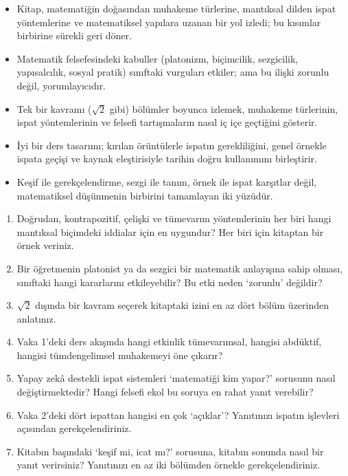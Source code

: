 
\begin{itemize}[leftmargin=1.4em]
\item Kitap, matematiğin doğasından muhakeme türlerine, mantıksal dilden ispat yöntemlerine ve matematiksel yapılara uzanan bir yol izledi; bu kısımlar birbirine sürekli geri döner.
\item Matematik felsefesindeki kabuller (platonizm, biçimcilik, sezgicilik, yapısalcılık, sosyal pratik) sınıftaki vurguları etkiler; ama bu ilişki zorunlu değil, yorumlayıcıdır.
\item Tek bir kavramı ($\sqrt2$ gibi) bölümler boyunca izlemek, muhakeme türlerinin, ispat yöntemlerinin ve felsefi tartışmaların nasıl iç içe geçtiğini gösterir.
\item İyi bir ders tasarımı; kırılan örüntülerle ispatın gerekliliğini, genel örnekle ispata geçişi ve kaynak eleştirisiyle tarihin doğru kullanımını birleştirir.
\item Keşif ile gerekçelendirme, sezgi ile tanım, örnek ile ispat karşıtlar değil, matematiksel düşünmenin birbirini tamamlayan iki yüzüdür.
\end{itemize}


\begin{enumerate}[leftmargin=1.8em,label=\textbf{\arabic*.}]
\item Doğrudan, kontrapozitif, çelişki ve tümevarım yöntemlerinin her biri hangi mantıksal biçimdeki iddialar için en uygundur? Her biri için kitaptan bir örnek veriniz.
\item Bir öğretmenin platonist ya da sezgici bir matematik anlayışına sahip olması, sınıftaki hangi kararlarını etkileyebilir? Bu etki neden ‘zorunlu’ değildir?
\item $\sqrt2$ dışında bir kavram seçerek kitaptaki izini en az dört bölüm üzerinden anlatınız.
\item Vaka 1’deki ders akışında hangi etkinlik tümevarımsal, hangisi abdüktif, hangisi tümdengelimsel muhakemeyi öne çıkarır?
\item Yapay zekâ destekli ispat sistemleri ‘matematiği kim yapar?’ sorusunu nasıl değiştirmektedir? Hangi felsefi ekol bu soruya en rahat yanıt verebilir?
\item Vaka 2’deki dört ispattan hangisi en çok ‘açıklar’? Yanıtınızı ispatın işlevleri açısından gerekçelendiriniz.
\item Kitabın başındaki ‘keşif mi, icat mı?’ sorusuna, kitabın sonunda nasıl bir yanıt verirsiniz? Yanıtınızı en az iki bölümden örnekle gerekçelendiriniz.
\end{enumerate}

